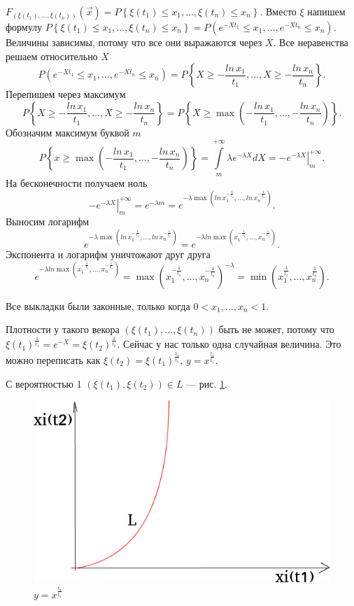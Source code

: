 $F_{ \left( \xi \left( t_1 \right), \dotsc, \xi \left( t_n \right) \right) }
  \left( \vec{x} \right) =
  P \left\{ \xi \left( t_1 \right) \leq x_1, \dotsc, \xi \left( t_n \right) \leq x_n \right\} $.
Вместо $ \xi $ напишем формулу
$P \left\{ \xi \left( t_1 \right) \leq x_1, \dotsc, \xi \left( t_n \right) \leq x_n \right\} =
  P \left( e^{-Xt_1} \leq x_1, \dotsc, e^{-Xt_n} \leq x_n \right) $.
Величины зависимы, потому что все они выражаются через $X$.
Все неравенства решаем относительно $X$
$$P \left( e^{-Xt_1} \leq x_1, \dotsc, e^{-Xt_n} \leq x_n \right) =
  P \left\{ X \geq -\frac{ln \, x_1}{t_1}, \dotsc, X \geq -\frac{ln \, x_n}{t_n} \right\}.$$
Перепишем через максимум
$$P \left\{ X \geq -\frac{ln \, x_1}{t_1}, \dotsc, X \geq -\frac{ln \, x_n}{t_n} \right\} =
  P \left\{
    X \geq \max \left( -\frac{ln \, x_1}{t_1}, \dotsc, -\frac{ln \, x_n}{t_n} \right) \right\}.$$
Обозначим максимум буквой $m$
$$P \left\{
    x \geq \max \left( -\frac{ln \, x_1}{t_1}, \dotsc, -\frac{ln \, x_n}{t_n} \right) \right\} =
  \int \limits_m^{+\infty } \lambda e^{-\lambda X} dX =
  -\left. e^{-\lambda X} \right|_m^{+\infty}.$$
На бесконечности получаем ноль
$$-\left. e^{-\lambda X} \right|_m^{+\infty} =
  e^{-\lambda m} =
  e^{-\lambda \max \left( ln \, x_1^{-\frac{1}{t_1}}, \dotsc, ln \, x_n^{-\frac{1}{t_n}} \right) }.$$
Выносим логарифм
$$e^{-\lambda \max \left( ln \, x_1^{-\frac{1}{t_1}}, \dotsc, ln \, x_n^{-\frac{1}{t_n}} \right) } =
e^{-\lambda ln \max \left( x_1^{-\frac{1}{t_1}}, \dotsc, x_n^{-\frac{1}{t_n}} \right) }.$$
Экспонента и логарифм уничтожают друг друга
$$e^{-\lambda ln \max \left( x_1^{-\frac{1}{t_1}}, \dotsc, x_n^{-\frac{1}{t_n}} \right) } =
  \max \left( x_1^{-\frac{1}{t_1}}, \dotsc, x_n^{-\frac{1}{t_n}} \right)^{-\lambda } =
  \min \left( x_1^{ \frac{ \lambda }{t_1}}, \dotsc, x_n^{ \frac{ \lambda }{t_n}} \right).$$

Все выкладки были законные, только когда $0 < x_1, \dotsc, x_n < 1$.

Плотности у такого векора $ \left( \xi \left( t_1 \right), \dotsc, \xi \left( t_n \right) \right) $
быть не может, потому что
$ \xi \left( t_1 \right)^{ \frac{1}{t_1}} =
  e^{-X} =
  \xi \left( t_2 \right)^{ \frac{1}{t_2}}$.
Сейчас у нас только одна случайная величина.
Это можно переписать как
$ \xi \left( t_2 \right) = \xi \left( t_1 \right)^{ \frac{t_2}{t_1}}, \,
  y = x^{ \frac{t_2}{t_1}}.$

С вероятностью 1 $ \left( \xi \left( t_1 \right), \xi \left( t_2 \right) \right) \in L$ ---
рис. \ref{fig:232}.

\begin{figure}[h!]
  \centering
  \includegraphics[width=.5\textwidth]{./pictures/2_3_2.png}
  \caption{$y = x^{ \frac{t_2}{t_1}}$}
  \label{fig:232}
\end{figure}

